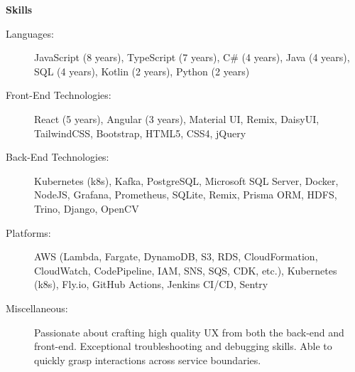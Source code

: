 \documentclass[letterpaper,11pt]{article}
\newcommand{\resheading}[1]{{\large \colorbox{mygrey}{\begin{minipage}{\textwidth}{\textbf{#1 \vphantom{p\^{E}}}}\end{minipage}}}}
\begin{document}
\resheading{Skills}
\begin{description}
	\item[Languages:]
	JavaScript (8 years), TypeScript (7 years), C\# (4 years), Java (4 years), SQL (4 years), Kotlin (2 years), Python (2 years)
	\item[Front-End Technologies:]
	React (5 years), Angular (3 years), Material UI, Remix, DaisyUI, TailwindCSS, Bootstrap, HTML5, CSS4, jQuery
	\item[Back-End Technologies:]
	Kubernetes (k8s), Kafka, PostgreSQL, Microsoft SQL Server, Docker, NodeJS, Grafana, Prometheus, SQLite, Remix, Prisma ORM, HDFS, Trino, Django, OpenCV
	\item[Platforms:]
	AWS (Lambda, Fargate, DynamoDB, S3, RDS, CloudFormation, CloudWatch, CodePipeline, IAM, SNS, SQS, CDK, etc.), Kubernetes (k8s), Fly.io, GitHub Actions, Jenkins CI/CD, Sentry
	\item[Miscellaneous:]
	Passionate about crafting high quality UX from both the back-end and front-end. Exceptional troubleshooting and debugging skills. Able to quickly grasp interactions across service boundaries.
\end{description}
\end{document}
